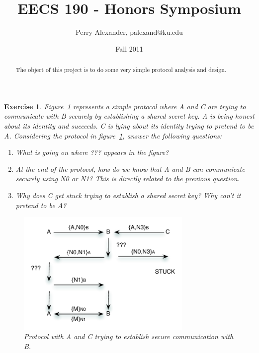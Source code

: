 \documentclass{tufte-handout}
\title{EECS 190 - Honors Symposium}
\author{Perry Alexander, palexand@ku.edu}
\date{Fall 2011}
\newtheorem{exercise}{Exercise}
\begin{document}
\maketitle

\begin{abstract}
  The object of this project is to do some very simple protocol analysis
  and design.
\end{abstract}

\begin{exercise}
  
  Figure~\ref{fig:protocol} represents a simple protocol where A and C
  are trying to communicate with B securely by establishing a shared
  secret key.  A is being honest about its identity and succeeds.  C
  is lying about its identity trying to pretend to be A.  Considering
  the protocol in figure~\ref{fig:protocol}, answer the following
  questions:

  \begin{enumerate}
  \item What is going on where ??? appears in the figure?
  \item At the end of the protocol, how do we know that A and B can
    communicate securely using N0 or N1?  This is directly related to
    the previous question.
  \item Why does C get stuck trying to establish a shared secret key?
    Why can't it pretend to be A?
  \end{enumerate}

  \begin{figure}[hbtp]
    \centering
    \includegraphics[width=0.75\textwidth]{protocol.pdf}
    \caption{Protocol with A and C trying to establish secure communication with B.}
    \label{fig:protocol}
  \end{figure}
\end{exercise}
\end{document}
